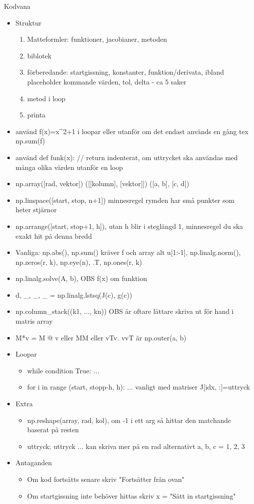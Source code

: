 \documentclass[a4paper]{article}
\begin{document}
Kodvana
\begin{itemize}
    \item Struktur
    \begin{enumerate}
        \item Matteformler: funktioner, jacobianer, metoden
        \item biblotek
        \item förberedande: startgissning, konstanter, funktion/derivata, ibland placeholder kommande värden, tol, delta - ca 5 saker 
        \item metod i loop
        \item printa
    \end{enumerate}
    \item använd f(x)=x^2+1 i loopar eller utanför om det endast används en gång tex np.sum(f)
    \item använd def funk(x): // return indenterat, om uttrycket ska användas med många olika värden utanför en loop
    \item np.array([rad, vektor]) ([[kolumn], [vektor]]) ([a, b], [c, d])
    \item np.linspace([start, stop, n+1]) minnesregel rymden har små punkter som heter stjärnor
    \item np.arrange([start, stop+1, h]), utan h blir i steglängd 1, minnesregel du ska exakt hit på denna bredd
    \item Vanliga: np.abs(), np.sum() kräver f och array alt u[1:-1], np.linalg.norm(), np.zeros(r, k), np.eye(n), .T, np.ones(r, k)
    \item np.linalg.solve(A, b), OBS f(x) om funktion
    \item d, _, _, _ = np.linalg.lstsq(J(c), g(c))
    \item np.column_stack((k1, ..., kn)) OBS är oftare lättare skriva ut för hand i matris array
    \item M*v = M @ v eller MM eller vTv. vvT är np.outer(a, b)
    \item Loopar
    \begin{itemize}
        \item while condition True: ...
        \item for i in range (start, stopp-h, h): ... vanligt med matriser J[idx, :]=uttryck
    \end{itemize}
    \item Extra
    \begin{itemize}
        \item np.reshape(array, rad, kol), om -1 i ett arg så hittar den matchande baserat på resten
        \item uttryck; uttryck ... kan skriva mer på en rad alternativt a, b, c = 1, 2, 3
    \end{itemize}
    \item Antaganden
    \begin{itemize}
        \item Om kod fortsätts senare skriv "Fortsätter från ovan"
        \item Om startgissning inte behöver hittas skriv x = "Sätt in startgissning"
    \end{itemize}
\end{itemize}
\end{document}
